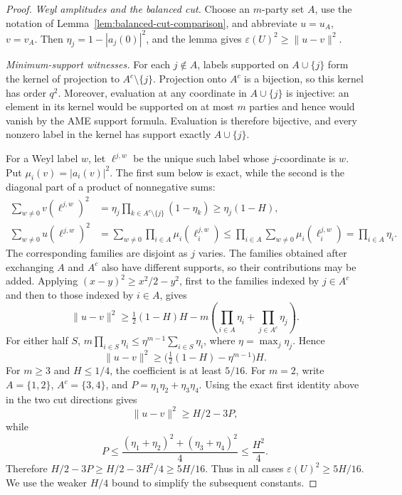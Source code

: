 \begin{proof}
\medskip\noindent\emph{Weyl amplitudes and the balanced cut.}
Choose an \(m\)-party set \(A\), use the notation of
Lemma~\ref{lem:balanced-cut-comparison}, and abbreviate
\(u=u_A\), \(v=v_A\).  Then \(\eta_j=1-|a_j(0)|^2\), and the lemma gives
\(\varepsilon(U)^2\geq\lVert u-v\rVert^2\).

\medskip\noindent\emph{Minimum-support witnesses.}
For each \(j\notin A\), labels supported on \(A\cup\{j\}\) form the kernel
of projection to \(A^c\setminus\{j\}\).  Projection onto \(A^c\) is a
bijection, so this kernel has order \(q^2\).  Moreover, evaluation at any
coordinate in \(A\cup\{j\}\) is injective: an element in its kernel would
be supported on at most \(m\) parties and hence would vanish by the AME
support formula.  Evaluation is therefore bijective, and every nonzero
label in the kernel has support exactly \(A\cup\{j\}\).

For a Weyl label \(w\), let \(\ell^{j,w}\) be the unique such label whose
\(j\)-coordinate is \(w\).  Put
\(\mu_i(v)=|a_i(v)|^2\).  The first sum below is exact, while the second is
the diagonal part of a product of nonnegative sums:
\[
\begin{split}
 \sum_{w\ne0}v(\ell^{j,w})^2
 &=\eta_j\prod_{k\in A^c\setminus\{j\}}(1-\eta_k)
 \geq\eta_j(1-H),\\
 \sum_{w\ne0}u(\ell^{j,w})^2
 &=\sum_{w\ne0}\prod_{i\in A}\mu_i(\ell_i^{j,w})
 \leq\prod_{i\in A}\sum_{w\ne0}\mu_i(\ell_i^{j,w})
 =\prod_{i\in A}\eta_i.
\end{split}
\]
The corresponding families are disjoint as \(j\) varies.  The families
obtained after exchanging \(A\) and \(A^c\) also have different supports,
so their contributions may be added.  Applying
\((x-y)^2\geq x^2/2-y^2\), first to the families indexed by
\(j\in A^c\) and then to those indexed by \(i\in A\), gives
\[
 \lVert u-v\rVert^2
 \geq\tfrac12(1-H)H-m\left(
      \prod_{i\in A}\eta_i+\prod_{j\in A^c}\eta_j\right).
\]
For either half \(S\),
\(m\prod_{i\in S}\eta_i\leq
  \eta^{m-1}\sum_{i\in S}\eta_i\), where
\(\eta=\max_j\eta_j\).  Hence
\[
 \lVert u-v\rVert^2
 \geq\bigl(\tfrac12(1-H)-\eta^{m-1}\bigr)H.
\]
For \(m\geq3\) and \(H\leq1/4\), the coefficient is at least \(5/16\).
For \(m=2\), write \(A=\{1,2\}\), \(A^c=\{3,4\}\), and
\(P=\eta_1\eta_2+\eta_3\eta_4\).  Using the exact first identity above in
the two cut directions gives
\[
 \lVert u-v\rVert^2\geq H/2-3P,
\]
while
\[
 P\leq\frac{(\eta_1+\eta_2)^2+(\eta_3+\eta_4)^2}{4}
 \leq\frac{H^2}{4}.
\]
Therefore
\(H/2-3P\geq H/2-3H^2/4\geq5H/16\).
Thus in all cases \(\varepsilon(U)^2\geq5H/16\).  We use the weaker
\(H/4\) bound to simplify the subsequent constants.


\end{proof}
